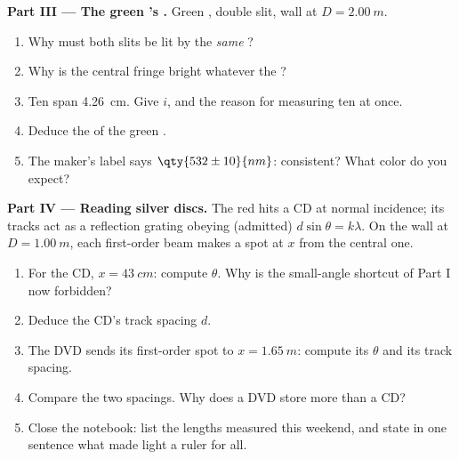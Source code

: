 \begin{problem}
\medskip
\noindent\textbf{Part III --- The green 's .} Green
, double slit, wall at $D = \qty{2.00}{m}$.
\begin{enumerate}[resume]
  \item Why must both slits be lit by the \emph{same} ?
  \item Why is the central fringe bright whatever the ?
  \item Ten  span \qty{4.26}{cm}. Give $i$, and the reason
        for measuring ten at once.
  \item Deduce the  of the green .
  \item The maker's label says $\qty{532 \pm 10}{nm}$: consistent?
        What color do you expect?
\end{enumerate}

\medskip
\noindent\textbf{Part IV --- Reading silver discs.} The red 
hits a CD at normal incidence; its tracks act as a reflection grating
obeying (admitted) $d \sin\theta = k\lambda$. On the wall at $D =
\qty{1.00}{m}$, each first-order beam makes a spot at $x$ from the
central one.
\begin{enumerate}[resume]
  \item For the CD, $x = \qty{43}{cm}$: compute $\theta$. Why is the
        small-angle shortcut of Part I now forbidden?
  \item Deduce the CD's track spacing $d$.
  \item The DVD sends its first-order spot to $x = \qty{1.65}{m}$:
        compute its $\theta$ and its track spacing.
  \item Compare the two spacings. Why does a DVD store more than a CD?
  \item Close the notebook: list the lengths measured this weekend,
        and state in one sentence what made light a ruler for all.
\end{enumerate}
\end{problem}
